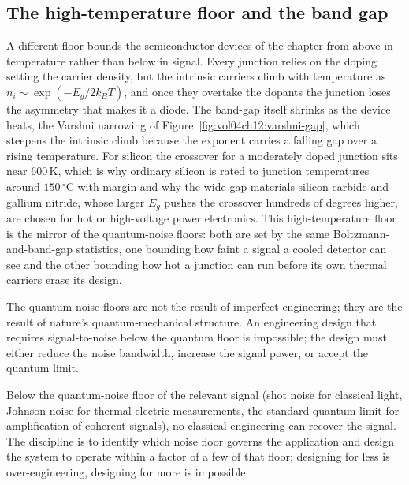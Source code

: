 \subsection{The high-temperature floor and the band gap}

A different floor bounds the semiconductor devices of the chapter from
above in temperature rather than below in signal. Every junction relies on
the doping setting the carrier density, but the intrinsic carriers climb
with temperature as $n_i \sim \exp(-E_g/2k_BT)$, and once they overtake the
dopants the junction loses the asymmetry that makes it a diode. The
band-gap itself shrinks as the device heats, the Varshni narrowing of
Figure~\ref{fig:vol04ch12:varshni-gap}, which steepens the intrinsic climb
because the exponent carries a falling gap over a rising temperature. For
silicon the crossover for a moderately doped junction sits near
$600\,\si{\kelvin}$, which is why ordinary silicon is rated to junction
temperatures around $150\,{}^{\circ}\mathrm{C}$ with margin and why the
wide-gap materials silicon carbide and gallium nitride, whose larger $E_g$
pushes the crossover hundreds of degrees higher, are chosen for hot or
high-voltage power electronics. This high-temperature floor is the
mirror of the quantum-noise floors: both are set by the same
Boltzmann-and-band-gap statistics, one bounding how faint a signal a cooled
detector can see and the other bounding how hot a junction can run before
its own thermal carriers erase its design.



The quantum-noise floors are not the result of imperfect engineering;
they are the result of nature's quantum-mechanical structure. An
engineering design that requires signal-to-noise below the quantum
floor is impossible; the design must either reduce the noise
bandwidth, increase the signal power, or accept the quantum limit.

\begin{principle}
Below the quantum-noise floor of the relevant signal (shot noise for
classical light, Johnson noise for thermal-electric measurements,
the standard quantum limit for amplification of coherent signals), no
classical engineering can recover the signal. The discipline is to
identify which noise floor governs the application and design the
system to operate within a factor of a few of that floor; designing
for less is over-engineering, designing for more is impossible.
\end{principle}

